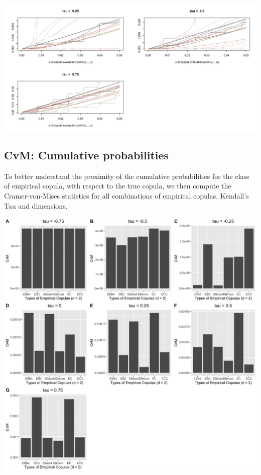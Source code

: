 \documentclass[12pt]{report}
\newcommand{\1}{\mathbf{1}}
\begin{document}
\begin{flushleft}
\begin{center}
\label{C_5d_c}
\includegraphics[width=17cm]{CumulativeProb/C_5d_c.png}
\end{center}%


\newpage
\subsection{CvM: Cumulative probabilities}
To better understand the proximity of the cumulative probabilities for the class of empirical copula, with respect to the true copula, we then compute the Cramer-von-Mises statistics for all combinations of empirical copulas, Kendall's Tau and dimensions.

\begin{center}
\label{t4_2d_c_CvM}
\includegraphics[width=17cm]{CumulativeCvM/t4_2d_c_CvM.png}
\end{center}%


\end{flushleft}
\end{document}

